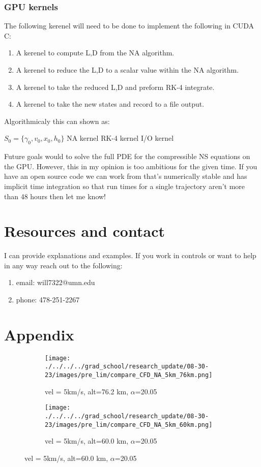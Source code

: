 \documentclass[12pt]{report} %
\begin{document}
\subsubsection*{GPU kernels}
The following kerenel will need to be done to implement the following in CUDA C:
\begin{enumerate}
    \item A kerenel to compute L,D from the NA algorithm.
    \item A kerenel to reduce the L,D to a scalar value within the NA algorithm. 
    \item A kerenel to take the reduced L,D and preform RK-4 integrate.
    \item A kerenel to take the new states and record to a file output.
\end{enumerate}
Algorithmicaly this can shown as:
\begin{algorithmic}
    \State $S_0 = \{\gamma_0,v_0,x_0,h_0\}$
    \State NA kernel
    \State RK-4 kernel 
    \State I/O kernel 
    \EndWhile
\end{algorithmic}

Future goals would to solve the full PDE for the compressible NS equations on the GPU. However, this in my opinion is too ambitious for the given time. If 
you have an open source code we can work from that's numerically stable and has implicit time integration so that run times for a single trajectory aren't more than 48 
hours then let me know! 
\section*{Resources and contact}
I can provide explanations and examples. If you work in controls or want to help in any way reach out to the following:
\begin{enumerate}
    \item email: will7322@umn.edu
    \item phone: 478-251-2267
\end{enumerate}
\newpage
\section*{Appendix}
\begin{figure}[hbt!]
    \begin{subfigure}[b]{0.6\textwidth}
      \centering
      \texttt{[image: ./../../../grad\_school/research\_update/08-30-23/images/pre\_lim/compare\_CFD\_NA\_5km\_76km.png]}
      \caption{ vel = 5km/s,  alt=76.2 km,   $\alpha$=20.05}
    \end{subfigure}
    \begin{subfigure}[b]{0.6\textwidth}
      \centering
      \texttt{[image: ./../../../grad\_school/research\_update/08-30-23/images/pre\_lim/compare\_CFD\_NA\_5km\_60km.png]}
      \caption{ vel = 5km/s,  alt=60.0 km,   $\alpha$=20.05}
    \end{subfigure}
\end{figure}
\end{document}
